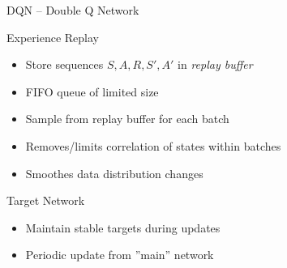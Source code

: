 \documentclass[ignorenonframetext,xcolor=x11names]{beamer}
\begin{document}
\begin{frame}[label=full]{DQN -- Double Q Network}
\begin{block}{Experience Replay}
\begin{itemize}
  \item Store sequences $S, A, R, S', A'$ in \emph{replay buffer}
  \item FIFO queue of limited size
  \item Sample from replay buffer for each batch
  \item Removes/limits correlation of states within batches
  \item Smoothes data distribution changes
\end{itemize}
\end{block}
\begin{block}{Target Network}
\begin{itemize}
   \item Maintain stable targets during updates
   \item Periodic update from ''main'' network
\end{itemize}
\end{block}
\end{frame}
\end{document}
